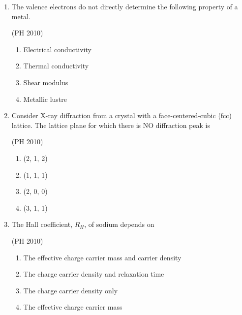 \documentclass[journal,12pt,onecolumn]{IEEEtran}
\theoremstyle{remark}
\begin{document}
\begin{enumerate}
then the Laplace transform of $f(x)$ is 

\hfill{(PH 2010)}
\begin{multicols}{4}
\begin{enumerate}
\item $s^{-2}e^{3x}$
\item $s^{2}e^{-3x}$
\item $s^{-2}$ 
\item $s^{-2}e^{-3x}$
\end{enumerate}
\end{multicols}

\item The valence electrons do not directly determine the following property of a metal. 

\hfill{(PH 2010)}
\begin{enumerate}
\item Electrical conductivity
\item Thermal conductivity
\item Shear modulus
\item Metallic lustre
\end{enumerate}


\item Consider X-ray diffraction from a crystal with a face-centered-cubic (fcc) lattice. The lattice plane for which there is NO diffraction peak is 

\hfill{(PH 2010)}
\begin{multicols}{4}
\begin{enumerate}
\item (2, 1, 2)
\item (1, 1, 1)
\item (2, 0, 0)
\item (3, 1, 1)
\end{enumerate}
\end{multicols}


\item The Hall coefficient, $R_H$, of sodium depends on 

\hfill{(PH 2010)}

\begin{enumerate}
\item The effective charge carrier mass and carrier density 
\item The charge carrier density and relaxation time
\item The charge carrier density only 
\item The effective charge carrier mass
\end{enumerate}



\end{enumerate}
\end{document}
